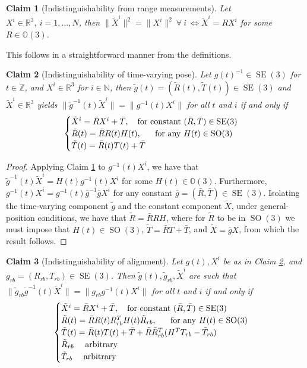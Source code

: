 \documentclass[]{article}
\newcommand{\bc}{\begin{cases}}
\newcommand{\ec}{\end{cases}}
\def\real{\mathbb{R}}
\newtheorem{claim}{Claim}
\def\gw{\tilde{g}}
\def\Xw{\tilde{X}}
\def\SO{\operatorname{SO}}
\def\SE{\operatorname{SE}}
\begin{document}
%
%
\begin{claim}[Indistinguishability from range measurements]\label{claim-range}
Let $X^i \in \real^3, \ i = 1, \dots, N$, then $\| \Xw^i \|^2 = \| X^i \|^2  \ \forall \ i \ \Leftrightarrow \Xw^i = R X^i$ for some $R\in {\mathbb O}(3)$.
\end{claim}
This follows in a straightforward manner from the definitions. 
\begin{claim}[Indistinguishability of time-varying pose]\label{claim-range-pose}
Let $g(t)^{-1}\in \SE(3)$ for $t\in {\mathbb Z}$, and $X^i \in \real^3$ for $i \in {\mathbb N}$, then $\gw(t) = (\tilde R(t), \tilde T(t)) \in \SE(3)$ and $\Xw^i\in \real^3$ yields  $\| \gw^{-1}(t) \Xw^i \| = \| g^{-1}(t) X^i\|$ for all $t$ and $i$ if and only if 
\begin{equation}
\bc
\Xw^i = \bar R X^i + \bar T, ~~~ {\rm for \ constant \ } (\bar R, \bar T) \in \SE(3)\\
\tilde R(t) = \bar R R(t) H(t), ~~~~~ {\rm for \ any \ } H(t) \in \SO(3) \\
\tilde T(t) = \bar R(t) T(t) + \bar T
\ec
\end{equation}
\end{claim}
\begin{proof}
Applying Claim \ref{claim-range} to $g^{-1}(t) X^i$, we have that $\gw^{-1}(t)\Xw^i = H(t) g^{-1}(t) X^i$ for some $H(t)\in {\mathbb O}(3)$. Furthermore, $g^{-1}(t)X^i = g^{-1}(t)\bar g^{-1}\bar g X^i$ for any constant $\bar g = (\bar R, \bar T) \in \SE(3)$. Isolating the time-varying component $\gw$ and the constant component $\Xw$, under general-position conditions, we have that $\tilde R = \bar R R H$, where for $\tilde R$ to be in $\SO(3)$ we must impose that $H(t) \in \SO(3)$, $\tilde T = \bar R T + \bar T$,  and $\Xw = \bar g X$, from which the result follows.
\end{proof}
\begin{claim}[Indistinguishability of alignment]\label{claim-range-alignment}
Let $g(t), X^i$ be as in Claim \ref{claim-range-pose}, and $g_{rb} = (R_{rb}, T_{rb}) \in \SE(3)$. Then
 $\gw(t), \gw_{rb}, \Xw^i$ are such that $\| \gw_{rb} \gw^{-1}(t) \Xw^i \| = \| g_{rb} g^{-1}(t) X^i\|$ for all $t$ and $i$ if and only if 
\begin{equation}
\bc
\Xw^i = \bar R X^i + \bar T, ~~~ {\rm for \ constant \ } (\bar R, \bar T) \in \SE(3)\\
\tilde R(t) = \bar R R(t) R_{rb}^T H(t) \tilde R_{rb}, ~~~~~ {\rm for \ any \ } H(t) \in \SO(3) \\
\tilde T(t) = \bar R(t) T(t) + \bar T + \tilde R \tilde R_{rb}^T(H^TT_{rb} - \tilde T_{rb})\\
\tilde R_{rb} ~~~~ {\rm arbitrary} \\
\tilde T_{rb} ~~~~ {\rm arbitrary}
\ec
\end{equation}
\end{claim}
\end{document}
